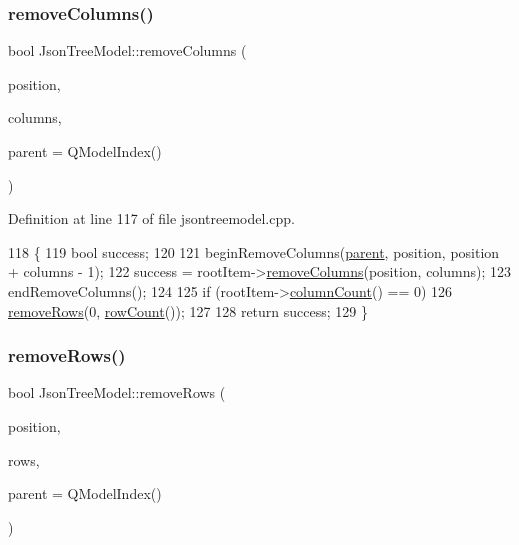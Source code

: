 \subsubsection{\texorpdfstring{remove\+Columns()}{removeColumns()}}
{\footnotesize\ttfamily bool Json\+Tree\+Model\+::remove\+Columns (\begin{DoxyParamCaption}\item[{int}]{position,  }\item[{int}]{columns,  }\item[{const Q\+Model\+Index \&}]{parent = {\ttfamily QModelIndex()} }\end{DoxyParamCaption})}



Definition at line 117 of file jsontreemodel.\+cpp.


\begin{DoxyCode}
118 \{
119     \textcolor{keywordtype}{bool} success;
120 
121     beginRemoveColumns(\hyperlink{class_json_tree_model_aea54120cdf66d49e8f0ad176eed8fc99}{parent}, position, position + columns - 1);
122     success = rootItem->\hyperlink{class_json_tree_item_a7cb315d624881ca9fbb193c5432a82b2}{removeColumns}(position, columns);
123     endRemoveColumns();
124 
125     \textcolor{keywordflow}{if} (rootItem->\hyperlink{class_json_tree_item_ad66ee4ac09255aa32fb05ffbd4057413}{columnCount}() == 0)
126         \hyperlink{class_json_tree_model_ae62d2fc8a4989d5d13880ee4ba45559f}{removeRows}(0, \hyperlink{class_json_tree_model_a7b9499f0aac83100742eaf4e0f160933}{rowCount}());
127 
128     \textcolor{keywordflow}{return} success;
129 \}
\end{DoxyCode}
\mbox{\label{class_json_tree_model_ae62d2fc8a4989d5d13880ee4ba45559f}} 
\subsubsection{\texorpdfstring{remove\+Rows()}{removeRows()}}
{\footnotesize\ttfamily bool Json\+Tree\+Model\+::remove\+Rows (\begin{DoxyParamCaption}\item[{int}]{position,  }\item[{int}]{rows,  }\item[{const Q\+Model\+Index \&}]{parent = {\ttfamily QModelIndex()} }\end{DoxyParamCaption})}



